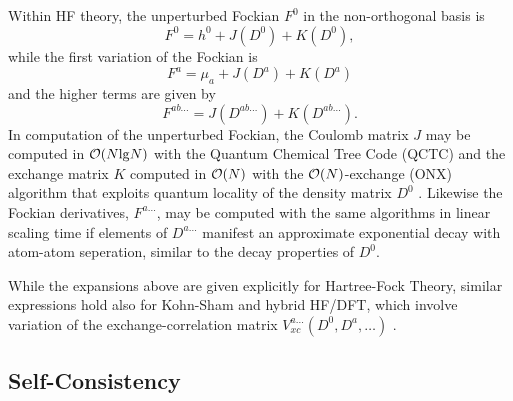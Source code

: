 \documentclass[prl,aps,letterpaper,twocolumn,showpacs,twocolumngrid,superbib]{revtex4}
\begin{document}
Within HF theory, the unperturbed Fockian $F^0$ in the non-orthogonal basis is 
\begin{equation}
F^0=h^0+J(D^0)+K(D^0), \label{fockian0}
\end{equation}
while the first variation of the Fockian is 
\begin{equation}
F^a=\mu_a+J(D^a)+K(D^a)
\end{equation}
and the higher terms are given by 
\begin{equation}
F^{ab\ldots}=J(D^{ab\ldots})+K(D^{ab\ldots}). \label{fockianN}
\end{equation}
In computation of the unperturbed Fockian, the Coulomb matrix $J$ may be computed in ${\cal O}(N{\rm lg}N)$ 
with the Quantum Chemical Tree Code (QCTC) \cite{MChallacombe97} and the
exchange matrix $K$ computed in ${\cal O}(N)$ with the ${\cal O}(N)$-exchange  (ONX) algorithm 
that exploits quantum locality of the density matrix $D^0$ \cite{ESchwegler97}.
Likewise the Fockian derivatives, $F^{a\ldots}$, may be computed 
with the same algorithms in linear scaling time if elements of 
$D^{a\ldots}$ manifest an approximate exponential decay with atom-atom seperation, 
similar to the decay properties of $D^0$. 

While the expansions above are given explicitly for Hartree-Fock Theory, similar expressions 
hold also for Kohn-Sham and hybrid HF/DFT,  which involve variation of the  exchange-correlation 
matrix $V_{xc}^{a\ldots}(D^0,D^a,\ldots)$ \cite{Lee_1994,PSalek02}.


\subsection{Self-Consistency}\label{SelfConsistency}
\end{document}
